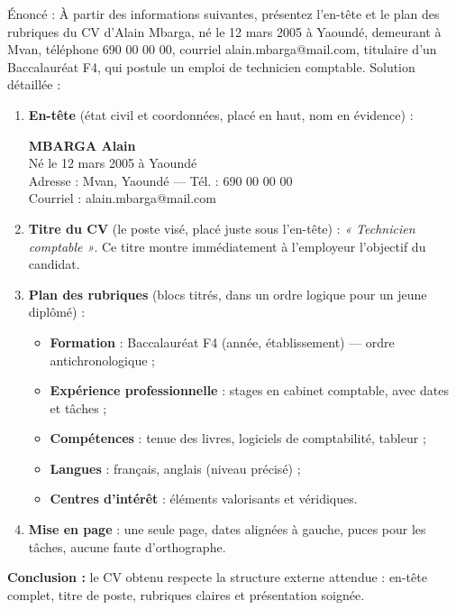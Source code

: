 \documentclass[11pt]{article}
\begin{document}
\begin{exoresolu}
Énoncé : À partir des informations suivantes, présentez l'en-tête et le plan des rubriques du CV d'Alain Mbarga, né le 12 mars 2005 à Yaoundé, demeurant à Mvan, téléphone 690 00 00 00, courriel alain.mbarga@mail.com, titulaire d'un Baccalauréat F4, qui postule un emploi de technicien comptable.
\tcblower
Solution détaillée :
\begin{enumerate}
\item \textbf{En-tête} (état civil et coordonnées, placé en haut, nom en évidence) :
\begin{center}
\textbf{MBARGA Alain}\\
Né le 12 mars 2005 à Yaoundé\\
Adresse : Mvan, Yaoundé — Tél. : 690 00 00 00\\
Courriel : alain.mbarga@mail.com
\end{center}
\item \textbf{Titre du CV} (le poste visé, placé juste sous l'en-tête) : \emph{« Technicien comptable »}. Ce titre montre immédiatement à l'employeur l'objectif du candidat.
\item \textbf{Plan des rubriques} (blocs titrés, dans un ordre logique pour un jeune diplômé) :
\begin{itemize}
\item \textbf{Formation} : Baccalauréat F4 (année, établissement) — ordre antichronologique ;
\item \textbf{Expérience professionnelle} : stages en cabinet comptable, avec dates et tâches ;
\item \textbf{Compétences} : tenue des livres, logiciels de comptabilité, tableur ;
\item \textbf{Langues} : français, anglais (niveau précisé) ;
\item \textbf{Centres d'intérêt} : éléments valorisants et véridiques.
\end{itemize}
\item \textbf{Mise en page} : une seule page, dates alignées à gauche, puces pour les tâches, aucune faute d'orthographe.
\end{enumerate}
\textbf{Conclusion :} le CV obtenu respecte la structure externe attendue : en-tête complet, titre de poste, rubriques claires et présentation soignée.
\end{exoresolu}
\end{document}
